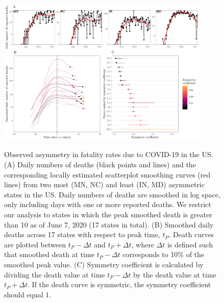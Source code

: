 \begin{figure}[t!]
\begin{center}
\includegraphics[width=0.9\textwidth]{deaths/national_deaths_metric_boot.pdf}\\
\caption{
Observed asymmetry in fatality rates due to COVID-19 in the US.
(A) Daily numbers of deaths (black points and lines) and the corresponding locally estimated scatterplot smoothing curves (red lines) from two most (MN, NC) and least (IN, MD) asymmetric states in the US.
Daily numbers of deaths are smoothed in log space, only including days with one or more reported deaths.
We restrict our analysis to states in which the peak smoothed death is greater than 10 as of June 7, 2020 (17 states in total).
(B) Smoothed daily deaths across 17 states with respect to peak time, $t_P$.
Death curves are plotted between $t_P - \Delta t$ and $t_P + \Delta t$, where $\Delta t$ is defined such that smoothed death at time $t_P - \Delta t$ corresponds to 10\% of the smoothed peak value.
(C) Symmetry coefficient is calculated by dividing the death value at time $t_P - \Delta t$ by the death value at time $t_P + \Delta t$. If the death curve is symmetric, the symmetry coefficient should equal 1.
\label{fig.plateaus_cases}}
\end{center}
\end{figure}

